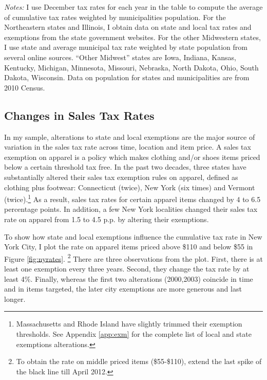 \documentclass[12pt]{article}
\begin{document}
\begin{table}
\begin{threeparttable}
		 					\begin{tablenotes}
		 						\small \emph{Notes:}  I use December tax rates for each year in the table to compute the average of cumulative tax rates weighted by municipalities population. For the Northeastern states and Illinois, I obtain data on state and local tax rates and exemptions from the state government websites. For the other Midwestern states, I use state and average municipal tax rate weighted by state population from several online sources. ``Other Midwest'' states are Iowa, Indiana, Kansas, Kentucky, Michigan, Minnesota, Missouri, Nebraska, North Dakota, Ohio, South Dakota, Wisconsin. Data on population for states and municipalities are from 2010 Census.
		 					\end{tablenotes}
		 				\end{threeparttable}
		 			\end{table}	
	\subsection{Changes in Sales Tax Rates}
	
	In my sample, alterations to state and local exemptions are the major source of variation in the sales tax rate across time, location and item price. A sales tax exemption on apparel is a policy which makes clothing and/or shoes items priced below a certain threshold tax free. 	
	 In the past two decades, three states have substantially altered their sales tax exemption rules on apparel, defined as clothing plus footwear: Connecticut (twice), New York  (six times) and Vermont (twice).\footnote{Massachusetts and Rhode Island have slightly trimmed their exemption thresholds. See Appendix \ref{app:exm} for the complete list of local and state exemptions alterations.}  As a result, sales tax rates for certain apparel items changed by 4 to 6.5 percentage points. In addition, a few New York localities changed their sales tax rate on apparel from 1.5 to 4.5 p.p. by altering their exemptions.
	
	
	To show how state and local exemptions influence the cumulative tax rate in New York City, I plot the rate on apparel items priced above \$110 and below \$55 in Figure \ref{fig:nyrates}. \footnote{To obtain the rate on middle priced items (\$55-\$110), extend the last spike of the black line till April 2012.} There are three observations from the plot. First, there is at least one exemption every three years. Second, they change the tax rate by at least 4\%. Finally, whereas the first two alterations (2000,2003) coincide in time and in items targeted, the later city exemptions are more generous and last longer.
	
\end{document}
